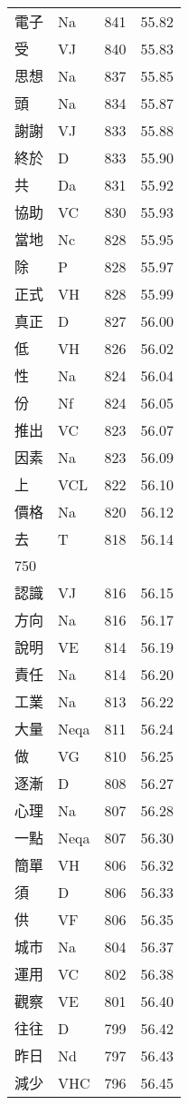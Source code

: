 \documentclass[twocolumn]{book}
\begin{document}
\begin{supertabular}{llrr}
電子 & Na & 841 &  55.82\\
受 & VJ & 840 &  55.83\\
思想 & Na & 837 &  55.85\\
頭 & Na & 834 &  55.87\\
謝謝 & VJ & 833 &  55.88\\
終於 & D & 833 &  55.90\\
共 & Da & 831 &  55.92\\
協助 & VC & 830 &  55.93\\
當地 & Nc & 828 &  55.95\\
除 & P & 828 &  55.97\\
正式 & VH & 828 &  55.99\\
真正 & D & 827 &  56.00\\
低 & VH & 826 &  56.02\\
性 & Na & 824 &  56.04\\
份 & Nf & 824 &  56.05\\
推出 & VC & 823 &  56.07\\
因素 & Na & 823 &  56.09\\
上 & VCL & 822 &  56.10\\
價格 & Na & 820 &  56.12\\
去 & T & 818 &  56.14\\
750\\
認識 & VJ & 816 &  56.15\\
方向 & Na & 816 &  56.17\\
說明 & VE & 814 &  56.19\\
責任 & Na & 814 &  56.20\\
工業 & Na & 813 &  56.22\\
大量 & Neqa & 811 &  56.24\\
做 & VG & 810 &  56.25\\
逐漸 & D & 808 &  56.27\\
心理 & Na & 807 &  56.28\\
一點 & Neqa & 807 &  56.30\\
簡單 & VH & 806 &  56.32\\
須 & D & 806 &  56.33\\
供 & VF & 806 &  56.35\\
城市 & Na & 804 &  56.37\\
運用 & VC & 802 &  56.38\\
觀察 & VE & 801 &  56.40\\
往往 & D & 799 &  56.42\\
昨日 & Nd & 797 &  56.43\\
減少 & VHC & 796 &  56.45\\

\end{supertabular}
\end{document}

